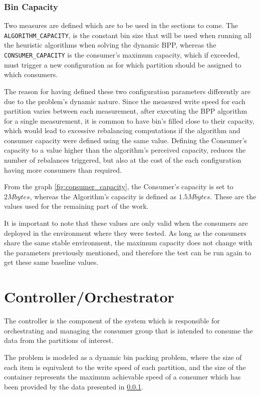 \subsubsection{Bin Capacity}
\label{result:bin capacity}

Two measures are defined which are to be used in the sections to come. The \lstinline[language=Python]{ALGORITHM_CAPACITY}, is the constant bin size that will be used when running all the heuristic algorithms when solving the dynamic BPP, whereas the \lstinline[language=Python]{CONSUMER_CAPACITY} is the consumer's maximum capacity, which if exceeded, must trigger a new configuration as for which partition should be assigned to which consumers.

The reason for having defined these two configuration parameters differently are due to the problem's dynamic nature. Since the measured write speed for each partition varies between each measurement, after executing the BPP algorithm for a single measurement, it is common to have bin's filled close to their capacity, which would lead to excessive rebalancing computations if the algorithm and consumer capacity were defined using the same value. Defining the Consumer's capacity to a value higher than the algorithm's perceived capacity, reduces the number of rebalances triggered, but also at the cost of the each configuration having more consumers than required. 

From the graph \ref{fig:consumer_capacity}, the Consumer's capacity is set to $2 Mbytes$, whereas the Algorithm's capacity is defined as $1.5 Mbytes$. These are the values used for the remaining part of the work.

It is important to note that these values are only valid when the consumers are deployed in the environment where they were tested. As long as the consumers share the same stable environment, the maximum capacity does not change with the parameters previously mentioned, and therefore the test can be run again to get these same baseline values. 

\section{Controller/Orchestrator}
\label{component:controller}

The controller is the component of the system which is responsible for orchestrating and managing the consumer group that is intended to consume the data from the partitions of interest. 

The problem is modeled as a dynamic bin packing problem, where the size of each item is equivalent to the write speed of each partition, and the size of the container represents the maximum achievable speed of a consumer which has been provided by the data presented in \ref{result:bin capacity}.

